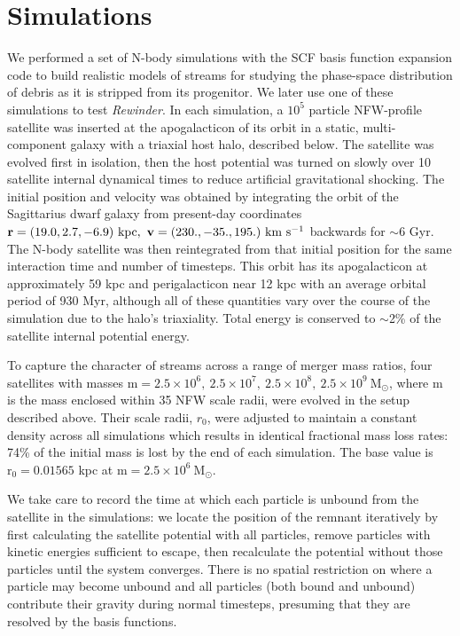 \documentclass[letterpaper,12pt,preprint]{aastex}
\newcommand{\msun}{\mathrm{M}_\odot}
\newcommand{\rewinder}{\emph{Rewinder}}
\begin{document}
\section{Simulations}\label{sec:sims}
We performed a set of N-body simulations with the SCF basis function expansion code \citep{hernquist92} to build realistic models of streams for studying the phase-space distribution of debris as it is stripped from its progenitor. We later use one of these simulations to test \rewinder. In each simulation, a $10^5$ particle NFW-profile satellite was inserted at the apogalacticon of its orbit in a static, multi-component galaxy with a triaxial host halo, described below. The satellite was evolved first in isolation, then the host potential was turned on slowly over 10 satellite internal dynamical times to reduce artificial gravitational shocking. The initial position and velocity was obtained by integrating the orbit of the Sagittarius dwarf galaxy from present-day coordinates ${\bf r}  =(19.0, 2.7, -6.9)\ \mathrm{kpc}, \ {\bf v} = (230., -35., 195.) \ \mathrm{km\ s^{-1}}$ \citep{law10} backwards for $\sim$6 Gyr. The N-body satellite was then reintegrated from that initial position for the same interaction time and number of timesteps. This orbit has its apogalacticon at approximately 59 kpc and perigalacticon near 12 kpc with an average orbital period of 930 Myr, although all of these quantities vary over the course of the simulation due to the halo's triaxiality. Total energy is conserved to $\sim$2\% of the satellite internal potential energy.

To capture the character of streams across a range of merger mass ratios, four satellites with masses $\mathrm{m} = 2.5 \times 10^6,\ 2.5 \times 10^7,\ 2.5 \times 10^8,\ 2.5 \times 10^9\ \msun$, where m is the mass enclosed within 35 NFW scale radii, were evolved in the setup described above. Their scale radii, $r_0$, were adjusted to maintain a constant density across all simulations which results in identical fractional mass loss rates: 74\% of the initial mass is lost by the end of each simulation. The base value is $\mathrm{r_0}=0.01565$ kpc at $\mathrm{m} = 2.5 \times 10^6\ \msun$.

We take care to record the time at which each particle is unbound from the satellite in the simulations: we locate the position of the remnant iteratively by first calculating the satellite potential with all particles, remove particles with kinetic energies sufficient to escape, then recalculate the potential without those particles until the system converges. There is no spatial restriction on where a particle may become unbound and all particles (both bound and unbound) contribute their gravity during normal timesteps, presuming that they are resolved by the basis functions. 
\end{document}
